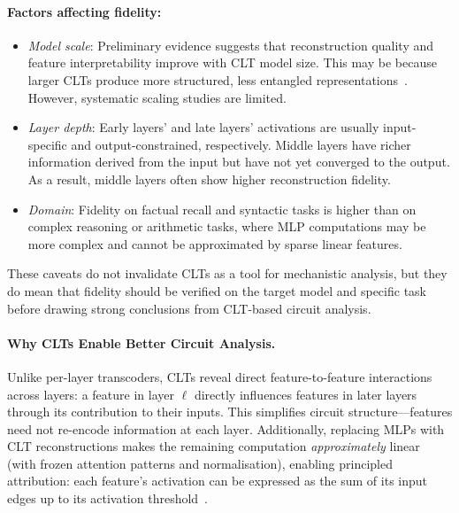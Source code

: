 \begin{warningbox}
\paragraph{Factors affecting fidelity:}
\begin{itemize}
    \item \textit{Model scale}: Preliminary evidence suggests that reconstruction quality and feature interpretability improve with CLT model size. This may be because larger CLTs produce more structured, less entangled representations~. However, systematic scaling studies are limited.
    \item \textit{Layer depth}: Early layers’ and late layers’ activations are usually input-specific and output-constrained, respectively. Middle layers have richer information derived from the input but have not yet converged to the output. As a result, middle layers often show higher reconstruction fidelity.
    \item \textit{Domain}: Fidelity on factual recall and syntactic tasks is higher than on complex reasoning or arithmetic tasks, where MLP computations may be more complex and cannot be approximated by sparse linear features.
\end{itemize}

These caveats do not invalidate CLTs as a tool for mechanistic analysis, but they do mean that fidelity should be verified on the target model and specific task before drawing strong conclusions from CLT-based circuit analysis.
\end{warningbox}

\paragraph{Why CLTs Enable Better Circuit Analysis.}
Unlike per-layer transcoders, CLTs reveal direct feature-to-feature interactions across layers: a feature in layer $\ell$ directly influences features in later layers through its contribution to their inputs. This simplifies circuit structure---features need not re-encode information at each layer. Additionally, replacing MLPs with CLT reconstructions makes the remaining computation \textit{approximately} linear (with frozen attention patterns and normalisation), enabling principled attribution: each feature's activation can be expressed as the sum of its input edges up to its activation threshold~.

